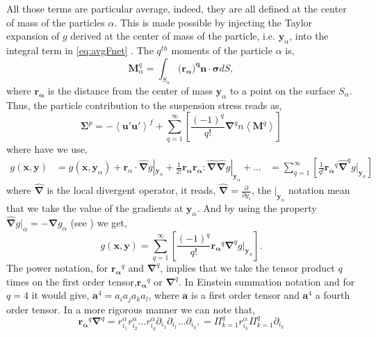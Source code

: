 All those terms are particular average, indeed, they are all defined at the center of mass of the particles $\alpha$. 
This is made possible by injecting the Taylor expansion of $g$ derived at the center of mass of the particle, i.e. $\bm{y}_\alpha$, into the integral term in \ref{eq:avgFnet} \citep{jackson1997locally}.
The $q^{th}$ moments of the particle $\alpha$ is,
\begin{equation*}
    \bm{M}^q_\alpha = \int_{S_\alpha} (\bm{\bm{r}_\alpha)^q } \bm{n}\cdot\bm{\sigma}dS,
    \label{eq:qthM}
\end{equation*}
where $\bm{\bm{r}_\alpha }$ is the distance from the center of mass $\bm{y}_\alpha$ to a point on the surface $S_\alpha$. 
Thus, the particle contribution to the suspension stress reads as,
\begin{equation*}
    \bm{\Sigma}^p = -\left<\bm{u'u'}\right>^f + \sum_{q=1}^\infty \left[\frac{(-1)^q}{q!} \bm{\nabla}^q n\left< \bm{M}^q\right>\right]
\end{equation*}
where have we use, 
\begin{align*}
    g(\textbf{x},\bm{y}) 
    &= g(\bm{x,y}_\alpha) 
    + \bm{r}_\alpha \cdot \hat{\bm{\nabla}} g|_{\bm{y}_\alpha} 
    + \frac{1}{2!} \bm{\bm{r}_\alpha \bm{r}_\alpha }:\hat{\bm{\nabla}}\hat{\bm{\nabla}}g|_{\bm{y}_\alpha} 
    + \ldots 
    &= \sum_{q=1}^\infty \left[\frac{1}{q!} \bm{\bm{r}_\alpha}^q\hat{\bm{\nabla}}^q  g|_{\bm{y}_\alpha}\right]
\end{align*}
where $\hat{\bm{\nabla}}$ is the local divergent operator, it reads, $\hat{\bm{\nabla}} = \frac{\partial}{\partial y_i}$,
 the $|_{\bm{y}_\alpha}$ notation mean that we take the value of the gradients at $\bm{y}_\alpha$.
And by using the property $\hat{\bm{\nabla}} g |_\alpha= - \bm{\nabla} g_\alpha $ (see \cite{anderson1967fluid}) we get, 
\begin{equation}
    g(\textbf{x},\bm{y}) 
    = \sum_{q=1}^\infty \left[\frac{(-1)^q}{q!} \bm{\bm{r}_\alpha}^q\bm{\nabla}^q  g|_{\bm{y}_\alpha}\right].
    \label{eq:expansion}
\end{equation}
The power notation, for $\bm{\bm{r}_\alpha}^q$ and $\bm{\nabla}^q$, implies that we take the tensor product $q$ times on the first order tensor,$\bm{\bm{r}_\alpha}^q$ or $\bm{\nabla}^q$.
In Einstein summation notation and for $q = 4$ it would give, $\bm{a}^4 = a_i a_j a_k a_l$, where $\bm{a}$ is a first order tensor and $\bm{a}^4$ a fourth order tensor.  
In a more rigorous manner we can note that, 
\begin{equation}
    \bm{\bm{r}_\alpha}^q\bm{\nabla}^q  
    = r^\alpha_{i_1}r^\alpha_{i_2}\ldots r^\alpha_{i_q}
    \partial_{i_1}\partial_{i_1}\ldots\partial_{i_q} ,
    =\Pi^q_{k=1}r^\alpha_{i_k}\Pi^q_{k=1}\partial_{i_k}
\end{equation}
